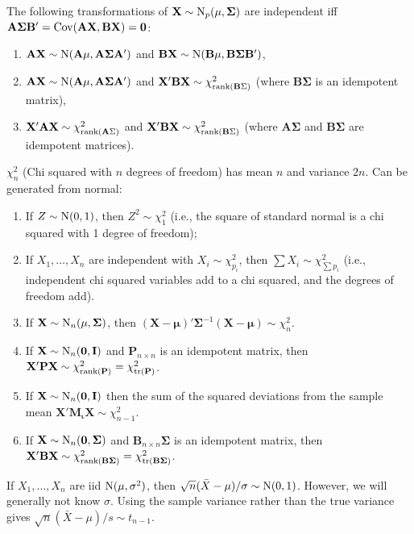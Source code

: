 \documentclass[8pt,letterpaper, landscape]{extarticle} %
\newcommand{\mA}{\ensuremath{\mathbf{A}}}
\newcommand{\mB}{\ensuremath{\mathbf{B}}}
\newcommand{\mX}{\ensuremath{\mathbf{X}}}
\newcommand{\mI}{\ensuremath{\mathbf{I}}}
\newcommand{\mi}{\ensuremath{\mathbf{\iota}}}
\newcommand{\mmu}{\ensuremath{\mathbf{\mu}}}
\newcommand{\mSigma}{\ensuremath{\mathbf{\Sigma}}}
\newcommand{\mzero}{\ensuremath{\mathbf{0}}}
\begin{document}
\begin{multicols}{3}
\begin{description}
The following transformations of $ \mX \sim \n_p (\mmu, \mSigma) $ are independent iff $ \mA \mSigma \mB' = \Cov (\mA \mX , \mB \mX) = \mzero $:
\begin{enumerate}
\item $ \mA \mX \sim \n (\mA \mmu , \mA \mSigma \mA') $ and $ \mB \mX \sim \n (\mB \mmu , \mB \mSigma \mB') $,
\item $ \mA \mX \sim \n (\mA \mmu , \mA \mSigma \mA') $ and $ \mX' \mB \mX \sim \chi^2_{\rank (\mB \Sigma)} $ (where $ \mB \mSigma $ is an idempotent matrix),
\item $ \mX' \mA \mX \sim \chi^2_{\rank (\mA \Sigma)} $ and $ \mX' \mB \mX \sim \chi^2_{\rank (\mB \Sigma)} $ (where $ \mA \mSigma $ and $ \mB \mSigma $ are idempotent matrices).
\end{enumerate}

 $ \chi^2_n $ (Chi squared with $ n $ degrees of freedom) has mean $ n $ and variance $ 2n $. Can be generated from normal:
\begin{enumerate}
\item If $ Z \sim \operatorname{N} (0,1) $, then $ Z^2 \sim \chi^2_1 $ (i.e., the square of standard normal is a chi squared with 1 degree of freedom);
\item If $ X_1, \dotsc, X_n $ are independent with $ X_i \sim \chi^2_{p_i} $, then $ \sum X_i \sim \chi^2_{\sum p_i} $ (i.e., independent chi squared variables add to a chi squared, and the degrees of freedom add).
\item If $ \mX \sim \n_n (\mmu, \mSigma) $, then $ (\mX - \mmu)' \mSigma^{-1} (\mX - \mmu) \sim \chi^2_n $.
\item If $ \mX \sim \n_n (\mzero, \mI) $ and $ \mathbf{P}_{n \times n} $ is an idempotent matrix, then $ \mX' \mathbf{P} \mX \sim \chi^2_{\rank (\mathbf{P})} = \chi^2_{\operatorname{tr} (\mathbf{P})} $.
\item If $ \mX \sim \n_n (\mzero, \mI) $ then the sum of the squared deviations from the sample mean $ \mX' \mathbf{M}_{\mi} \mX \sim \chi^2_{n-1} $.
\item If $ \mX \sim \n_n (\mzero, \mSigma) $ and $ \mB_{n \times n} \mSigma $ is an idempotent matrix, then $ \mX' \mB \mX \sim \chi^2_{\rank (\mB \mSigma)} = \chi^2_{\operatorname{tr} (\mB \mSigma)} $.
\end{enumerate}

 If $ X_1, \dotsc, X_n $ are iid $ \operatorname{N} (\mu, \sigma^2) $, then $ \sqrt{n} (\bar{X}-\mu) / \sigma \sim \operatorname{N} (0,1) $. However, we will generally not know $ \sigma $. Using the sample variance rather than the true variance gives $ \sqrt{n} (\bar{X}-\mu) / s \sim t_{n-1} $.


\end{description}
\end{multicols}
\end{document}
